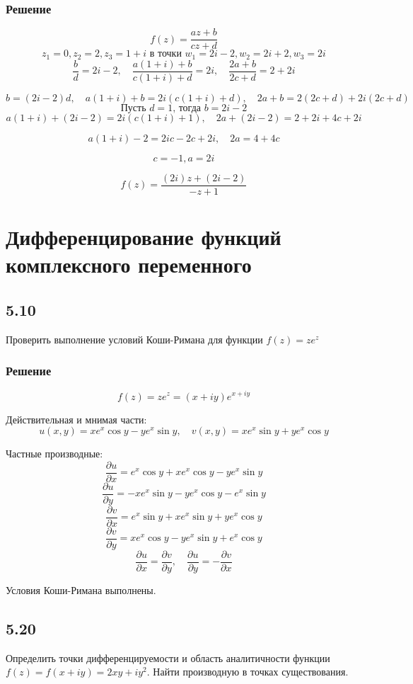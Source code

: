 \documentclass[12pt,a4paper]{article}
\begin{document}
\subsubsection*{Решение}
\[
f(z) = \frac{az + b}{cz + d}
\]
\[
z_1=0,z_2=2,z_3=1+i \text{ в точки } w_1=2i-2,w_2=2i+2,w_3=2i
\]
\[
\frac{b}{d} = 2i - 2, \quad \frac{a(1+i) + b}{c(1+i) + d} = 2i, \quad \frac{2a + b}{2c + d} = 2 + 2i
\]

\[
b = (2i - 2)d, \quad a(1+i) + b = 2i(c(1+i) + d), \quad 2a + b = 2(2c + d) + 2i(2c + d)
\]
\[
\text{Пусть } d = 1 \text{, тогда } b = 2i - 2
\]
\[
a(1+i) + (2i - 2) = 2i(c(1+i) + 1), \quad 2a + (2i - 2) = 2 + 2i + 4c + 2i
\]

\[
a(1+i) - 2 = 2ic - 2c + 2i, \quad 2a = 4 + 4c
\]

\[
 c = -1, a = 2i
\]

\[
f(z) = \frac{(2i)z + (2i - 2)}{-z + 1}
\]


\section{Дифференцирование функций комплексного переменного}
\subsection*{5.10}
Проверить выполнение условий Коши-Римана для функции $f(z)=ze^z$
\subsubsection*{Решение}

\[
f(z) = z e^z = (x+iy) e^{x+iy}
\]

Действительная и мнимая части:
\[
u(x, y) = x e^x \cos y - y e^x \sin y, \quad v(x, y) = x e^x \sin y + y e^x \cos y
\]

Частные производные:
\[
\frac{\partial u}{\partial x} = e^x \cos y + x e^x \cos y - y e^x \sin y
\]
\[
\frac{\partial u}{\partial y} = -x e^x \sin y - y e^x \cos y - e^x \sin y
\]
\[
\frac{\partial v}{\partial x} = e^x \sin y + x e^x \sin y + y e^x \cos y
\]
\[
\frac{\partial v}{\partial y} = x e^x \cos y - y e^x \sin y + e^x \cos y
\]
\[
\frac{\partial u}{\partial x} = \frac{\partial v}{\partial y}, \quad \frac{\partial u}{\partial y} = -\frac{\partial v}{\partial x}
\]

Условия Коши-Римана выполнены.

\subsection*{5.20}
Определить точки дифференцируемости и область аналитичности функции $f(z)=f(x+iy)=2xy+iy^2$. Найти производную в точках существования.
\end{document}
